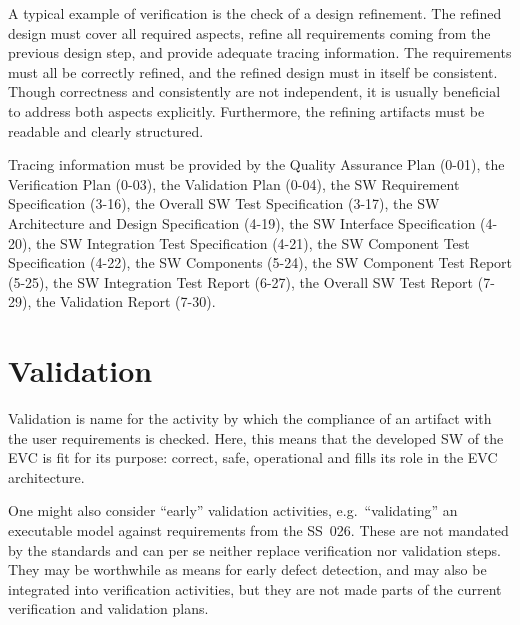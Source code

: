 \documentclass{template/openetcs_report}
\begin{document}
A typical example of verification is the check of a design
refinement. The refined design must cover all required aspects, refine
all requirements coming from the previous design step, and provide
adequate tracing information.  The requirements must all be correctly
refined, and the refined design must in itself be consistent. Though
correctness and consistently are not independent, it is usually
beneficial to address both aspects explicitly. Furthermore, the
refining artifacts must be readable and clearly structured.

Tracing information must be provided by the Quality Assurance Plan
(0-01), the Verification Plan (0-03), the Validation Plan (0-04), the
SW Requirement Specification (3-16), the Overall SW Test Specification
(3-17), the SW Architecture and Design
Specification (4-19), the SW Interface Specification (4-20), the SW
Integration Test Specification (4-21), the SW Component Test
Specification (4-22), the SW Components (5-24), the SW Component Test
Report (5-25), the SW Integration Test Report (6-27), the Overall SW
Test Report (7-29), the Validation Report (7-30).


\section{Validation}
\label{sec:definition-validation}
Validation is name for the activity by which the compliance of an
artifact with the user requirements is checked. Here, this means that
the developed SW of the EVC is fit for its purpose: correct, safe,
operational and fills its role in the EVC architecture.


One might also consider ``early'' validation activities, e.g.\
``validating'' an executable model against requirements from the
SS~026. These are not mandated by the standards and can per se neither
replace  verification nor validation steps. They may be worthwhile
as means for early defect detection, and may also be integrated into
verification activities, but they are not made parts of the current
verification and validation plans. 
\end{document}
